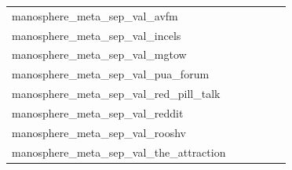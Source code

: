 \documentclass[dvipsnames]{article}
\begin{document}
\begin{appendix}
{\begin{longtable}{m{6cm}m{1.7cm}m{1.7cm}m{1.7cm}m{1.7cm}m{1.7cm}}
	manosphere\_meta\_sep\_val\_avfm  & \colorbox[HTML]{c2e698}{\makebox[\mywidth][c]{19.42}} & \colorbox[HTML]{9ad486}{\makebox[\mywidth][c]{19.27}} & \colorbox[HTML]{ffffe5}{\makebox[\mywidth][c]{21.88}} & \colorbox[HTML]{e6f5ad}{\makebox[\mywidth][c]{19.64}} & \colorbox[HTML]{77c578}{\makebox[\mywidth][c]{19.18}}\\
	manosphere\_meta\_sep\_val\_incels  & \colorbox[HTML]{77c578}{\makebox[\mywidth][c]{11.26}} & \colorbox[HTML]{c3e698}{\makebox[\mywidth][c]{12.18}} & \colorbox[HTML]{ffffe5}{\makebox[\mywidth][c]{21.40}} & \colorbox[HTML]{90d082}{\makebox[\mywidth][c]{11.51}} & \colorbox[HTML]{7cc77a}{\makebox[\mywidth][c]{11.29}}\\
	manosphere\_meta\_sep\_val\_mgtow  & \colorbox[HTML]{f8fcc3}{\makebox[\mywidth][c]{24.83}} & \colorbox[HTML]{d7efa2}{\makebox[\mywidth][c]{24.27}} & \colorbox[HTML]{ffffe5}{\makebox[\mywidth][c]{27.50}} & \colorbox[HTML]{bfe596}{\makebox[\mywidth][c]{24.12}} & \colorbox[HTML]{77c578}{\makebox[\mywidth][c]{23.80}}\\
	manosphere\_meta\_sep\_val\_pua\_forum  & \colorbox[HTML]{f5fbb7}{\makebox[\mywidth][c]{24.22}} & \colorbox[HTML]{d0ec9e}{\makebox[\mywidth][c]{23.85}} & \colorbox[HTML]{ffffe5}{\makebox[\mywidth][c]{26.52}} & \colorbox[HTML]{d0ec9e}{\makebox[\mywidth][c]{23.86}} & \colorbox[HTML]{77c578}{\makebox[\mywidth][c]{23.52}}\\
	manosphere\_meta\_sep\_val\_red\_pill\_talk  & \colorbox[HTML]{fafdcd}{\makebox[\mywidth][c]{34.59}} & \colorbox[HTML]{e2f3a9}{\makebox[\mywidth][c]{33.90}} & \colorbox[HTML]{ffffe5}{\makebox[\mywidth][c]{37.26}} & \colorbox[HTML]{e2f3a9}{\makebox[\mywidth][c]{33.90}} & \colorbox[HTML]{77c578}{\makebox[\mywidth][c]{33.27}}\\
	manosphere\_meta\_sep\_val\_reddit  & \colorbox[HTML]{ffffe5}{\makebox[\mywidth][c]{20.63}} & \colorbox[HTML]{d9f0a3}{\makebox[\mywidth][c]{19.78}} & \colorbox[HTML]{ffffe5}{\makebox[\mywidth][c]{21.10}} & \colorbox[HTML]{f5fbb8}{\makebox[\mywidth][c]{19.94}} & \colorbox[HTML]{77c578}{\makebox[\mywidth][c]{19.58}}\\
	manosphere\_meta\_sep\_val\_rooshv  & \colorbox[HTML]{f7fcbb}{\makebox[\mywidth][c]{22.46}} & \colorbox[HTML]{e2f3a9}{\makebox[\mywidth][c]{22.17}} & \colorbox[HTML]{ffffe5}{\makebox[\mywidth][c]{24.78}} & \colorbox[HTML]{ccea9c}{\makebox[\mywidth][c]{22.01}} & \colorbox[HTML]{77c578}{\makebox[\mywidth][c]{21.69}}\\
	manosphere\_meta\_sep\_val\_the\_attraction  & \colorbox[HTML]{f2fab5}{\makebox[\mywidth][c]{20.85}} & \colorbox[HTML]{d7efa2}{\makebox[\mywidth][c]{20.57}} & \colorbox[HTML]{ffffe5}{\makebox[\mywidth][c]{23.17}} & \colorbox[HTML]{d7efa2}{\makebox[\mywidth][c]{20.57}} & \colorbox[HTML]{77c578}{\makebox[\mywidth][c]{20.20}}\\

\end{longtable}}
\end{appendix}
\end{document}
